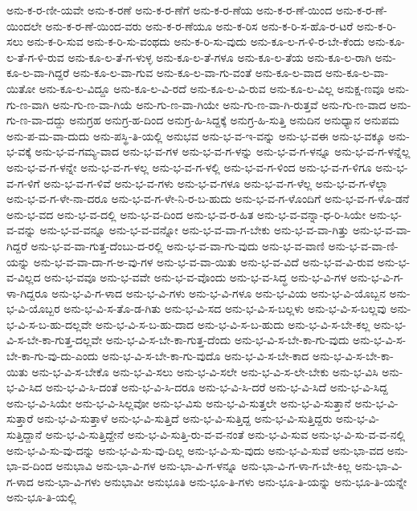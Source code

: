 {ಅನು-ಕ-ರ-ಣೀ-ಯವೇ
ಅನು-ಕ-ರಣೆ
ಅನು-ಕ-ರ-ಣೆಗೆ
ಅನು-ಕ-ರ-ಣೆಯ
ಅನು-ಕ-ರ-ಣೆ-ಯಿಂದ
ಅನು-ಕ-ರ-ಣೆ-ಯಿಂದಲೇ
ಅನು-ಕ-ರ-ಣೆ-ಯಿಂದ-ವರು
ಅನು-ಕ-ರ-ಣೆಯೂ
ಅನು-ಕ-ರಿಸ
ಅನು-ಕ-ರಿ-ಸ-ಹೊ-ರ-ಟರೆ
ಅನು-ಕ-ರಿ-ಸಲು
ಅನು-ಕ-ರಿ-ಸುವ
ಅನು-ಕ-ರಿ-ಸು-ವಂಥದು
ಅನು-ಕ-ರಿ-ಸು-ವುದು
ಅನು-ಕೂ-ಲ-ಗ-ಳಿ-ರ-ಬೇ-ಕೆಂದು
ಅನು-ಕೂ-ಲ-ತೆ-ಗ-ಳಿ-ರುವ
ಅನು-ಕೂ-ಲ-ತೆ-ಗ-ಳುಳ್ಳ
ಅನು-ಕೂ-ಲ-ತೆ-ಗಳೂ
ಅನು-ಕೂ-ಲ-ತೆಯ
ಅನು-ಕೂ-ಲ-ರಾಗಿ
ಅನು-ಕೂ-ಲ-ವಾ-ಗಿದ್ದರೆ
ಅನು-ಕೂ-ಲ-ವಾ-ಗುವ
ಅನು-ಕೂ-ಲ-ವಾ-ಗು-ವಂತೆ
ಅನು-ಕೂ-ಲ-ವಾದ
ಅನು-ಕೂ-ಲ-ವಾ-ಯಿತೋ
ಅನು-ಕೂ-ಲ-ವಿದ್ದೂ
ಅನು-ಕೂ-ಲ-ವಿ-ರದೆ
ಅನು-ಕೂ-ಲ-ವಿ-ರುವ
ಅನು-ಕೂ-ಲ-ವಿಲ್ಲ
ಅನುಕ್ಷ-ಣವೂ
ಅನು-ಗು-ಣ-ವಾಗಿ
ಅನು-ಗು-ಣ-ವಾ-ಗಿಯೆ
ಅನು-ಗು-ಣ-ವಾ-ಗಿಯೇ
ಅನು-ಗು-ಣ-ವಾ-ಗಿ-ರುತ್ತವೆ
ಅನು-ಗು-ಣ-ವಾದ
ಅನು-ಗು-ಣ-ವಾ-ದದ್ದು
ಅನುಗ್ರಹ
ಅನುಗ್ರ-ಹ-ದಿಂದ
ಅನುಗ್ರ-ಹಿ-ಸಿದ್ದಕ್ಕೆ
ಅನುಗ್ರ-ಹಿ-ಸುತ್ತಿ
ಅನುದಿನ
ಅನುಧ್ಯಾನ
ಅನುಪಮ
ಅನು-ಪ-ಮ-ವಾ-ದುದು
ಅನು-ಪಸ್ಥಿ-ತಿ-ಯಲ್ಲಿ
ಅನುಭವ
ಅನು-ಭ-ವ-ಇ-ವನ್ನು
ಅನು-ಭ-ವಈ
ಅನು-ಭ-ವಕ್ಕೂ
ಅನು-ಭ-ವಕ್ಕೆ
ಅನು-ಭ-ವ-ಗಮ್ಯ-ವಾದ
ಅನು-ಭ-ವ-ಗಳ
ಅನು-ಭ-ವ-ಗ-ಳನ್ನು
ಅನು-ಭ-ವ-ಗ-ಳನ್ನೂ
ಅನು-ಭ-ವ-ಗ-ಳನ್ನೆಲ್ಲ
ಅನು-ಭ-ವ-ಗ-ಳನ್ನೇ
ಅನು-ಭ-ವ-ಗ-ಳಲ್ಲ
ಅನು-ಭ-ವ-ಗ-ಳಲ್ಲಿ
ಅನು-ಭ-ವ-ಗ-ಳಿಂದ
ಅನು-ಭ-ವ-ಗ-ಳಿಗೂ
ಅನು-ಭ-ವ-ಗ-ಳಿಗೆ
ಅನು-ಭ-ವ-ಗ-ಳಿವೆ
ಅನು-ಭ-ವ-ಗಳು
ಅನು-ಭ-ವ-ಗಳೂ
ಅನು-ಭ-ವ-ಗ-ಳೆಲ್ಲ
ಅನು-ಭ-ವ-ಗ-ಳೆಲ್ಲಾ
ಅನು-ಭ-ವ-ಗ-ಳೇ-ನಾ-ದರೂ
ಅನು-ಭ-ವ-ಗ-ಳೇ-ನಿ-ರ-ಬ-ಹುದು
ಅನು-ಭ-ವ-ಗ-ಳೊಂದಿಗೆ
ಅನು-ಭ-ವ-ಗ-ಳೊ-ಡನೆ
ಅನು-ಭ-ವದ
ಅನು-ಭ-ವ-ದಲ್ಲಿ
ಅನು-ಭ-ವ-ದಿಂದ
ಅನು-ಭ-ವ-ರ-ಹಿತ
ಅನು-ಭ-ವ-ವನ್ನಾ-ಧ-ರಿ-ಸಿಯೇ
ಅನು-ಭ-ವ-ವನ್ನು
ಅನು-ಭ-ವ-ವನ್ನೂ
ಅನು-ಭ-ವ-ವನ್ನೋ
ಅನು-ಭ-ವ-ವಾ-ಗ-ಬೇಕು
ಅನು-ಭ-ವ-ವಾ-ಗಿತ್ತು
ಅನು-ಭ-ವ-ವಾ-ಗಿದ್ದರೆ
ಅನು-ಭ-ವ-ವಾ-ಗುತ್ತ-ದೆಂಬು-ದ-ರಲ್ಲಿ
ಅನು-ಭ-ವ-ವಾ-ಗು-ವುದು
ಅನು-ಭ-ವ-ವಾಣಿ
ಅನು-ಭ-ವ-ವಾ-ಣಿ-ಯನ್ನು
ಅನು-ಭ-ವ-ವಾ-ದಾ-ಗ-ಅ-ವು-ಗಳ
ಅನು-ಭ-ವ-ವಾ-ಯಿತು
ಅನು-ಭ-ವ-ವಿದೆ
ಅನು-ಭ-ವ-ವಿ-ರುವ
ಅನು-ಭ-ವ-ವಿಲ್ಲದ
ಅನು-ಭ-ವವೂ
ಅನು-ಭ-ವವೇ
ಅನು-ಭ-ವ-ವೊಂದು
ಅನು-ಭ-ವ-ಸಿದ್ಧ
ಅನು-ಭ-ವಿ-ಗಳ
ಅನು-ಭ-ವಿ-ಗ-ಳಾ-ಗಿದ್ದರೂ
ಅನು-ಭ-ವಿ-ಗ-ಳಾದ
ಅನು-ಭ-ವಿ-ಗಳು
ಅನು-ಭ-ವಿ-ಗಳೂ
ಅನು-ಭ-ವಿಯ
ಅನು-ಭ-ವಿ-ಯೊಬ್ಬನ
ಅನು-ಭ-ವಿ-ಯೊಬ್ಬರ
ಅನು-ಭ-ವಿ-ಸ-ತೊ-ಡ-ಗಿತು
ಅನು-ಭ-ವಿ-ಸದ
ಅನು-ಭ-ವಿ-ಸ-ಬಲ್ಲಳು
ಅನು-ಭ-ವಿ-ಸ-ಬಲ್ಲವು
ಅನು-ಭ-ವಿ-ಸ-ಬ-ಹು-ದಲ್ಲವೇ
ಅನು-ಭ-ವಿ-ಸ-ಬ-ಹು-ದಾದ
ಅನು-ಭ-ವಿ-ಸ-ಬ-ಹುದು
ಅನು-ಭ-ವಿ-ಸ-ಬೇ-ಕಲ್ಲ
ಅನು-ಭ-ವಿ-ಸ-ಬೇ-ಕಾ-ಗುತ್ತ-ದಲ್ಲವೇ
ಅನು-ಭ-ವಿ-ಸ-ಬೇ-ಕಾ-ಗುತ್ತ-ದೆಂದು
ಅನು-ಭ-ವಿ-ಸ-ಬೇ-ಕಾ-ಗು-ವುದು
ಅನು-ಭ-ವಿ-ಸ-ಬೇ-ಕಾ-ಗು-ವು-ದು-ಎಂದು
ಅನು-ಭ-ವಿ-ಸ-ಬೇ-ಕಾ-ಗು-ವುದೊ
ಅನು-ಭ-ವಿ-ಸ-ಬೇ-ಕಾದ
ಅನು-ಭ-ವಿ-ಸ-ಬೇ-ಕಾ-ಯಿತು
ಅನು-ಭ-ವಿ-ಸ-ಬೇಕೊ
ಅನು-ಭ-ವಿ-ಸಲು
ಅನು-ಭ-ವಿ-ಸಲೇ
ಅನು-ಭ-ವಿ-ಸ-ಲೇ-ಬೇಕು
ಅನು-ಭ-ವಿಸಿ
ಅನು-ಭ-ವಿ-ಸಿದ
ಅನು-ಭ-ವಿ-ಸಿ-ದಂತೆ
ಅನು-ಭ-ವಿ-ಸಿ-ದರೂ
ಅನು-ಭ-ವಿ-ಸಿ-ದರೆ
ಅನು-ಭ-ವಿ-ಸಿದೆ
ಅನು-ಭ-ವಿ-ಸಿದ್ದ
ಅನು-ಭ-ವಿ-ಸಿಯೇ
ಅನು-ಭ-ವಿ-ಸಿಲ್ಲವೋ
ಅನು-ಭ-ವಿಸು
ಅನು-ಭ-ವಿ-ಸುತ್ತಲೇ
ಅನು-ಭ-ವಿ-ಸುತ್ತಾನೆ
ಅನು-ಭ-ವಿ-ಸುತ್ತಾರೆ
ಅನು-ಭ-ವಿ-ಸುತ್ತಾಳೆ
ಅನು-ಭ-ವಿ-ಸುತ್ತಿದೆ
ಅನು-ಭ-ವಿ-ಸುತ್ತಿದ್ದ
ಅನು-ಭ-ವಿ-ಸುತ್ತಿದ್ದರು
ಅನು-ಭ-ವಿ-ಸುತ್ತಿದ್ದಾನೆ
ಅನು-ಭ-ವಿ-ಸುತ್ತಿದ್ದೇನೆ
ಅನು-ಭ-ವಿ-ಸುತ್ತಿ-ರು-ವ-ವ-ನಂತೆ
ಅನು-ಭ-ವಿ-ಸುವ
ಅನು-ಭ-ವಿ-ಸು-ವ-ವ-ನಲ್ಲಿ
ಅನು-ಭ-ವಿ-ಸು-ವು-ದನ್ನು
ಅನು-ಭ-ವಿ-ಸು-ವು-ದಿಲ್ಲ
ಅನು-ಭ-ವಿ-ಸು-ವುದು
ಅನು-ಭ-ವಿ-ಸುವೆ
ಅನು-ಭಾ-ವದ
ಅನು-ಭಾ-ವ-ದಿಂದ
ಅನುಭಾವಿ
ಅನು-ಭಾ-ವಿ-ಗಳ
ಅನು-ಭಾ-ವಿ-ಗ-ಳನ್ನೂ
ಅನು-ಭಾ-ವಿ-ಗ-ಳಾ-ಗ-ಬೇ-ಕಿಲ್ಲ
ಅನು-ಭಾ-ವಿ-ಗ-ಳಾದ
ಅನು-ಭಾ-ವಿ-ಗಳು
ಅನುಭಾವೀ
ಅನುಭೂತಿ
ಅನು-ಭೂ-ತಿ-ಗಳು
ಅನು-ಭೂ-ತಿ-ಯನ್ನು
ಅನು-ಭೂ-ತಿ-ಯನ್ನೇ
ಅನು-ಭೂ-ತಿ-ಯಲ್ಲಿ
}
